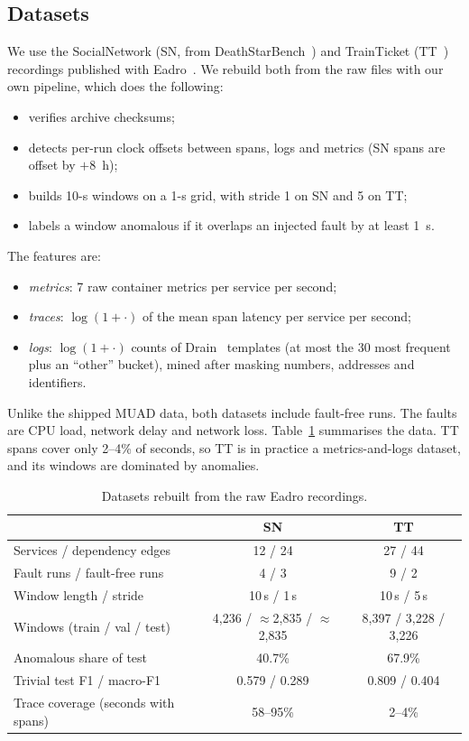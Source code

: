 \documentclass[journal]{IEEEtran}
\begin{document}
\subsection{Datasets}
We use the SocialNetwork (SN, from DeathStarBench~\cite{gan2019deathstarbench}) and TrainTicket
(TT~\cite{zhou2018trainticket}) recordings published with Eadro~\cite{lee2023eadro}. We rebuild both from the
raw files with our own pipeline, which does the following:
\begin{itemize}
  \item verifies archive checksums;
  \item detects per-run clock offsets between spans, logs and metrics (SN spans are offset by $+8$~h);
  \item builds 10-s windows on a 1-s grid, with stride 1 on SN and 5 on TT;
  \item labels a window anomalous if it overlaps an injected fault by at least 1~s.
\end{itemize}
The features are:
\begin{itemize}
  \item \emph{metrics}: 7 raw container metrics per service per second;
  \item \emph{traces}: $\log(1+\cdot)$ of the mean span latency per service per second;
  \item \emph{logs}: $\log(1+\cdot)$ counts of Drain~\cite{he2017drain} templates (at most the 30 most frequent
  plus an ``other'' bucket), mined after masking numbers, addresses and identifiers.
\end{itemize}
Unlike the shipped MUAD data, both datasets include fault-free runs. The faults are CPU load, network delay and
network loss. Table~\ref{tab:data} summarises the data. TT spans cover only 2--4\% of seconds, so TT is in
practice a metrics-and-logs dataset, and its windows are dominated by anomalies.

\begin{table}[!t]
\caption{Datasets rebuilt from the raw Eadro recordings.}
\label{tab:data}
\centering
\footnotesize
\setlength{\tabcolsep}{3.5pt}
\begin{tabular}{@{}lcc@{}}
\toprule
 & SN & TT \\
\midrule
Services / dependency edges & 12 / 24 & 27 / 44 \\
Fault runs / fault-free runs & 4 / 3 & 9 / 2 \\
Window length / stride & 10\,s / 1\,s & 10\,s / 5\,s \\
Windows (train / val / test) & 4,236 / $\approx$2,835 / $\approx$2,835 & 8,397 / 3,228 / 3,226 \\
Anomalous share of test & 40.7\% & 67.9\% \\
Trivial test F1 / macro-F1 & 0.579 / 0.289 & 0.809 / 0.404 \\
Trace coverage (seconds with spans) & 58--95\% & 2--4\% \\
\bottomrule
\end{tabular}
\end{table}
\end{document}
